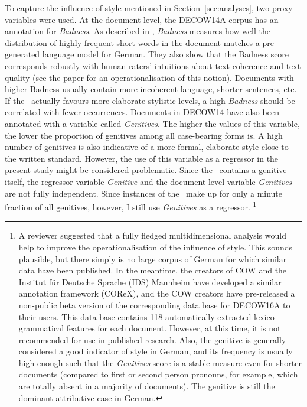 To capture the influence of style mentioned in Section~\ref{sec:analyses}, two proxy variables were used.
At the document level, the DECOW14A corpus has an annotation for \textit{Badness}.
As described in \cite{SchaeferEa2013}, \textit{Badness} measures how well the distribution of highly frequent short words in the document matches a pre-generated language model for German.
They also show that the Badness score corresponds robustly with human raters' intuitions about text coherence and text quality (see the paper for an operationalisation of this notion).
Documents with higher Badness usually contain more incoherent language, shorter sentences, etc.
If the \PGCa\ actually favours more elaborate stylistic levels, a high \textit{Badness} should be correlated with fewer occurrences.
Documents in DECOW14 have also been annotated with a variable called \textit{Genitives}.
The higher the values of this variable, the lower the proportion of genitives among all case-bearing forms is.
A high number of genitives is also indicative of a more formal, elaborate style close to the written standard.
However, the use of this variable as a regressor in the present study might be considered problematic.
Since the \PGCa\ contains a genitive itself, the regressor variable \textit{Genitive} and the document-level variable \textit{Genitives} are not fully independent.
Since instances of the \PGCa\ make up for only a minute fraction of all genitives, however, I still use \textit{Genitives} as a regressor.%
\footnote{A reviewer suggested that a fully fledged multidimensional analysis \citep{Biber1988} would help to improve the operationalisation of the influence of style.
This sounds plausible, but there simply is no large corpus of German for which similar data have been published.
In the meantime, the creators of COW and the Institut für Deutsche Sprache (IDS) Mannheim have developed a similar annotation framework (COReX), and the COW creators have pre-released a non-public beta version of the corresponding data base for DECOW16A to their users.
This data base contains 118 automatically extracted lexico-grammatical features for each document.
However, at this time, it is not recommended for use in published research.
Also, the genitive is generally considered a good indicator of style in German, and its frequency is usually high enough such that the \textit{Genitives} score is a stable measure even for shorter documents (compared to first or second person pronouns, for example, which are totally absent in a majority of documents).
The genitive is still the dominant attributive case in German.}


